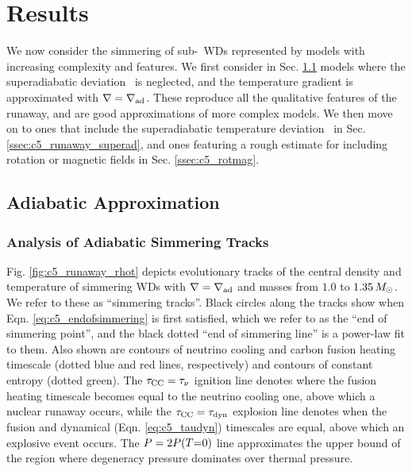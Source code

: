\section{Results}
\label{sec:c5_results}

We now consider the simmering of sub-\Mch\ WDs represented by models with increasing complexity and features.  We first consider in Sec. \ref{ssec:c5_runaway_ad} models where the superadiabatic deviation \dnabconv\ is neglected, and the temperature gradient is approximated with $\nabla = \nablaad$. These reproduce all the qualitative features of the runaway, and are good approximations of more complex models.  We then move on to ones that include the superadiabatic temperature deviation \dnabconv\ in Sec. \ref{ssec:c5_runaway_superad}, and ones featuring a rough estimate for including rotation or magnetic fields in Sec. \ref{ssec:c5_rotmag}.

\subsection{Adiabatic Approximation}
\label{ssec:c5_runaway_ad}

\subsubsection{Analysis of Adiabatic Simmering Tracks}
\label{ssec:c5_runaway_ad_analysis}

Fig. \ref{fig:c5_runaway_rhot} depicts evolutionary tracks of the central density and temperature of simmering WDs with $\nabla = \nablaad$ and masses from $1.0$ to $1.35\,\Msun$.  We refer to these as ``simmering tracks''.  Black circles along the tracks show when Eqn. \ref{eq:c5_endofsimmering} is first satisfied, which we refer to as the ``end of simmering point'', and the black dotted ``end of simmering line'' is a power-law fit to them.  Also shown are contours of neutrino cooling and carbon fusion heating timescale (dotted blue and red lines, respectively) and contours of constant entropy (dotted green).  The $\taucc = \taunu$ ignition line denotes where the fusion heating timescale becomes equal to the neutrino cooling one, above which a nuclear runaway occurs, while the $\taucc = \taudyn$ explosion line denotes when the fusion and dynamical (Eqn. \ref{eq:c5_taudyn}) timescales are equal, above which an explosive event occurs.  The $P = 2P(T\mathrm{=}0)$ line approximates the upper bound of the region where degeneracy pressure dominates over thermal pressure.

